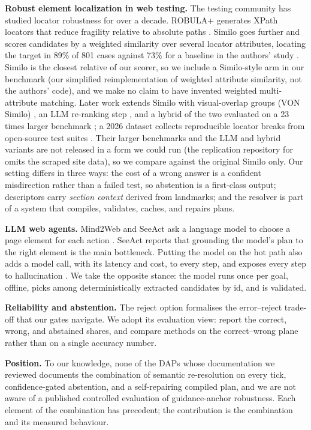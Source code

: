 \documentclass[conference]{IEEEtran}
\begin{document}
\textbf{Robust element localization in web testing.}
The testing community has studied locator robustness for over a decade. ROBULA+ generates XPath locators that reduce fragility relative to absolute paths \cite{leotta2016robula}. Similo goes further and scores candidates by a weighted similarity over several locator attributes, locating the target in 89\% of 801 cases against 73\% for a baseline in the authors' study \cite{nass2023similo}. Similo is the closest relative of our scorer, so we include a Similo-style arm in our benchmark (our simplified reimplementation of weighted attribute similarity, not the authors' code), and we make no claim to have invented weighted multi-attribute matching. Later work extends Similo with visual-overlap groups (VON Similo) \cite{nass2023von}, an LLM re-ranking step \cite{nass2023llm}, and a hybrid of the two evaluated on a 23 times larger benchmark \cite{kluge2025relocalization}; a 2026 dataset collects reproducible locator breaks from open-source test suites \cite{reprobreak2026}. Their larger benchmarks and the LLM and hybrid variants are not released in a form we could run (the replication repository for \cite{kluge2025relocalization} omits the scraped site data), so we compare against the original Similo only. Our setting differs in three ways: the cost of a wrong answer is a confident misdirection rather than a failed test, so abstention is a first-class output; descriptors carry \emph{section context} derived from landmarks; and the resolver is part of a system that compiles, validates, caches, and repairs plans.

\textbf{LLM web agents.}
Mind2Web and SeeAct ask a language model to choose a page element for each action \cite{deng2023mind2web,zheng2024seeact}. SeeAct reports that grounding the model's plan to the right element is the main bottleneck. Putting the model on the hot path also adds a model call, with its latency and cost, to every step, and exposes every step to hallucination \cite{ji2023}. We take the opposite stance: the model runs once per goal, offline, picks among deterministically extracted candidates by id, and is validated.

\textbf{Reliability and abstention.}
The reject option \cite{chow1970} formalises the error--reject trade-off that our gates navigate. We adopt its evaluation view: report the correct, wrong, and abstained shares, and compare methods on the correct--wrong plane rather than on a single accuracy number.

\textbf{Position.}
To our knowledge, none of the DAPs whose documentation we reviewed documents the combination of semantic re-resolution on every tick, confidence-gated abstention, and a self-repairing compiled plan, and we are not aware of a published controlled evaluation of guidance-anchor robustness. Each element of the combination has precedent; the contribution is the combination and its measured behaviour.
\end{document}
